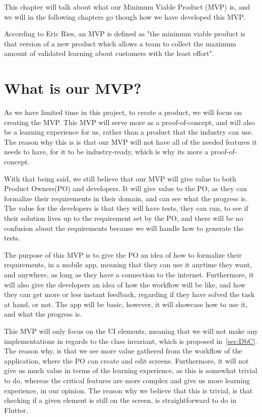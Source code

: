 This chapter will talk about what our Minimum Viable Product (MVP) is, and we will in the following chapters go though how we have developed this MVP.

According to Eric Ries, an MVP is defined as "the minimum viable product is that version of a new product which allows a team to collect the maximum amount of validated learning about customers with the least effort"\cite{whatIsMVP}.

\section{What is our MVP?}
As we have limited time in this project, to create a product, we will focus on creating the MVP.
This MVP will serve more as a proof-of-concept, and will also be a learning experience for us, rather than a product that the industry can use.
The reason why this is is that our MVP will not have all of the needed features it needs to have, for it to be industry-ready, which is why its more a proof-of-concept.

With that being said, we still believe that our MVP will give value to both Product Owners(PO) and developers.
It will give value to the PO, as they can formalize their requirements in their domain, and can see what the progress is.
The value for the developers is that they will have tests, they can run, to see if their solution lives up to the requirement set by the PO, and there will be no confusion about the requirements because we will handle how to generate the tests. 

The purpose of this MVP is to give the PO an idea of how to formalize their requirements, in a mobile app, meaning that they can use it anytime they want, and anywhere, as long as they have a connection to the internet.
Furthermore, it will also give the developers an idea of how the workflow will be like, and how they can get more or less instant feedback, regarding if they have solved the task at hand, or not. 
The app will be basic, however, it will showcase how to use it, and what the progress is. 

This MVP will only focus on the UI elements, meaning that we will not make any implementations in regards to the class invariant, which is proposed in~\autoref{sec:DbC}.
The reason why, is that we see more value gathered from the workflow of the application, where the PO can create and edit screens.
Furthermore, it will not give us much value in terms of the learning experience, as this is somewhat trivial to do, whereas the critical features are more complex and give us more learning experience, in our opinion.
The reason why we believe that this is trivial, is that checking if a given element is still on the screen, is straightforward to do in Flutter.


